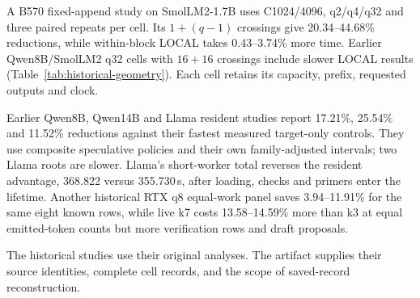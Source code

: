 A B570 fixed-append study on SmolLM2-1.7B uses C1024/4096, q2/q4/q32 and three paired repeats per cell. Its $1+(q-1)$ crossings give 20.34--44.68\% reductions, while within-block LOCAL takes 0.43--3.74\% more time. Earlier Qwen8B/SmolLM2 q32 cells with $16+16$ crossings include slower LOCAL results (Table~\ref{tab:historical-geometry}). Each cell retains its capacity, prefix, requested outputs and clock.


Earlier Qwen8B, Qwen14B and Llama resident studies report 17.21\%, 25.54\% and 11.52\% reductions against their fastest measured target-only controls. They use composite speculative policies and their own family-adjusted intervals; two Llama roots are slower. Llama's short-worker total reverses the resident advantage, 368.822 versus 355.730\,s, after loading, checks and primers enter the lifetime. Another historical RTX q8 equal-work panel saves 3.94--11.91\% for the same eight known rows, while live k7 costs 13.58--14.59\% more than k3 at equal emitted-token counts but more verification rows and draft proposals.


The historical studies use their original analyses. The artifact supplies their source identities, complete cell records, and the scope of saved-record reconstruction.
